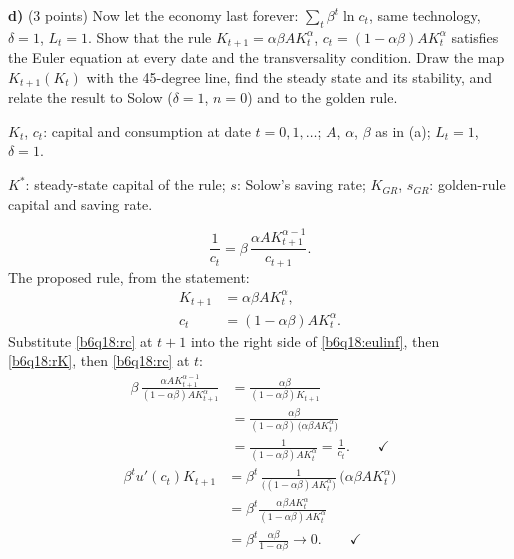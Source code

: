 \textbf{d)} (3 points) Now let the economy last forever: $\sum_t\beta^t\ln c_t$, same technology, $\delta=1$, $L_t=1$. Show that the rule
$K_{t+1}=\alpha\beta AK_t^\alpha$, $c_t=(1-\alpha\beta)AK_t^\alpha$ satisfies the Euler equation at every date and the transversality condition.
Draw the map $K_{t+1}(K_t)$ with the 45-degree line, find the steady state and its stability, and relate the result to Solow
($\delta=1$, $n=0$) and to the golden rule.
\resolespaco
\begin{sol}
\begin{notacao}
\item $K_t$, $c_t$: capital and consumption at date $t=0,1,\dots$; $A$, $\alpha$, $\beta$ as in (a); $L_t=1$, $\delta=1$.
\item $K^\ast$: steady-state capital of the rule; $s$: Solow's saving rate; $K_{GR}$, $s_{GR}$: golden-rule capital and saving rate.
\end{notacao}
\begin{equation}
\frac1{c_t}=\beta\,\frac{\alpha AK_{t+1}^{\alpha-1}}{c_{t+1}}. \label{b6q18:eulinf}
\end{equation}
The proposed rule, from the statement:
\begin{align}
K_{t+1}&=\alpha\beta AK_t^\alpha, \label{b6q18:rK}\\
c_t&=(1-\alpha\beta)AK_t^\alpha. \label{b6q18:rc}
\end{align}
Substitute \eqref{b6q18:rc} at $t+1$ into the right side of \eqref{b6q18:eulinf}, then \eqref{b6q18:rK}, then \eqref{b6q18:rc} at $t$:
\begin{align*}
\beta\,\frac{\alpha AK_{t+1}^{\alpha-1}}{(1-\alpha\beta)AK_{t+1}^\alpha}&=\frac{\alpha\beta}{(1-\alpha\beta)K_{t+1}}\\
&=\frac{\alpha\beta}{(1-\alpha\beta)\,\big(\alpha\beta AK_t^\alpha\big)}\\
&=\frac1{(1-\alpha\beta)AK_t^\alpha}=\frac1{c_t}.\qquad\checkmark
\end{align*}
\begin{align*}
\beta^tu'(c_t)K_{t+1}&=\beta^t\,\frac{1}{\big((1-\alpha\beta)AK_t^\alpha\big)}\,\big(\alpha\beta AK_t^\alpha\big)\\
&=\beta^t\frac{\alpha\beta AK_t^\alpha}{(1-\alpha\beta)AK_t^\alpha}\\
&=\beta^t\frac{\alpha\beta}{1-\alpha\beta}\to0 .\qquad\checkmark

\end{align*}
\end{sol}
